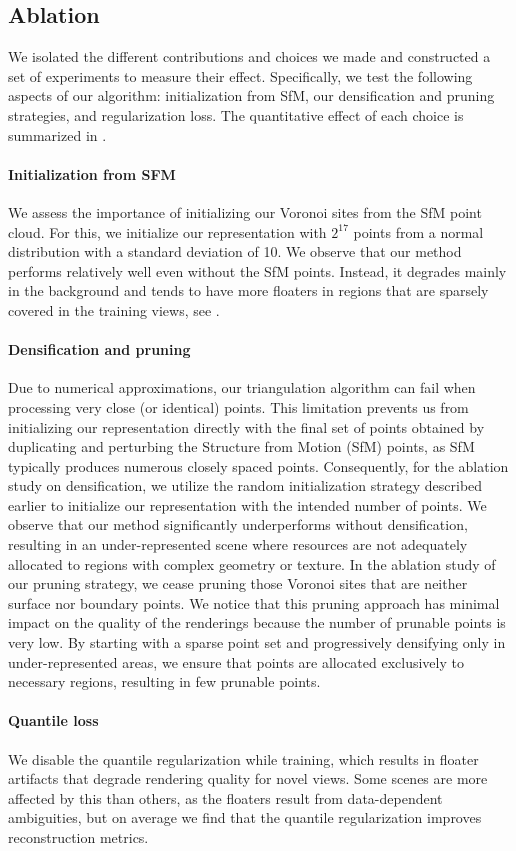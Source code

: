 
\subsection{Ablation}

We isolated the different contributions and choices we made and constructed a set of experiments to measure their effect. 
Specifically, we test the following aspects of our algorithm: initialization from SfM, our densification and pruning strategies, and regularization loss. 
The quantitative effect of each choice is summarized in .

\paragraph{Initialization from SFM} 
We assess the importance of initializing our Voronoi sites from the SfM point cloud. 
For this, we initialize our representation with $2^{17}$ points from a normal distribution with a standard deviation of 10.
We observe that our method performs relatively well even without the SfM points. 
Instead, it degrades mainly in the background and tends to have more floaters in regions that are sparsely covered in the training views, see .

\paragraph{Densification and pruning}
Due to numerical approximations, our triangulation algorithm can fail when processing very close (or identical) points. 
This limitation prevents us from initializing our representation directly with the final set of points obtained by duplicating and perturbing the Structure from Motion (SfM) points, as SfM typically produces numerous closely spaced points.
% 
Consequently, for the ablation study on densification, we utilize the random initialization strategy described earlier to initialize our representation with the intended number of points.
We observe that our method significantly underperforms without densification, resulting in an under-represented scene where resources are not adequately allocated to regions with complex geometry or texture.
\quad
In the ablation study of our pruning strategy, we cease pruning those Voronoi sites that are neither surface nor boundary points. 
We notice that this pruning approach has minimal impact on the quality of the renderings because the number of prunable points is very low. 
By starting with a sparse point set and progressively densifying only in under-represented areas, we ensure that points are allocated exclusively to necessary regions, resulting in few prunable points.

\paragraph{Quantile loss}
We disable the quantile regularization while training, which results in floater artifacts that degrade rendering quality for novel views.
Some scenes are more affected by this than others, as the floaters result from data-dependent ambiguities, but on average we find that the quantile regularization improves reconstruction metrics.
